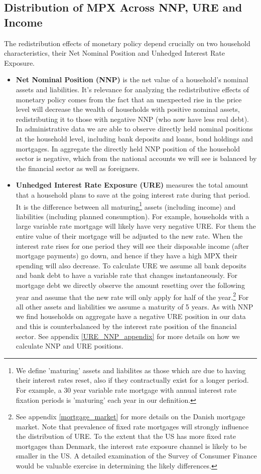 \documentclass[titlepage]{\econtex}\newcommand{\texname}{ConsumptionHeterogeneity}
\begin{document}
\subsection{Distribution of MPX Across NNP, URE and Income}
The redistribution effects of monetary policy depend crucially on two household characteristics, their Net Nominal Position and Unhedged Interest Rate Exposure.
\begin{itemize}
	\item \textbf{Net Nominal Position (NNP)} is the net value of a household's nominal assets and liabilities. It's relevance for analyzing the redistributive effects of monetary policy comes from the fact that an unexpected rise in the price level will decrease the wealth of households with positive nominal assets, redistributing it to those with negative NNP (who now have less real debt). In administrative data we are able to observe directly held nominal positions at the household level, including bank deposits and loans, bond holdings and mortgages. In aggregate the directly held NNP position of the household sector is negative, which from the national accounts we will see is balanced by the financial sector as well as foreigners.
	\item \textbf{Unhedged Interest Rate Exposure (URE)} measures the total amount that a household plans to save at the going interest rate during that period. It is the difference between all maturing\footnote{We define 'maturing' assets and liabilites as those which are due to having their interest rates reset, also if they contractually exist for a longer period. For example, a 30 year variable rate mortgage with annual interest rate fixation periods is 'maturing' each year in our definition.} assets (including income) and liabilities (including planned consumption). For example, households with a large variable rate mortgage will likely have very negative URE. For them the entire value of their mortgage will be adjusted to the new rate. When the interest rate rises for one period they will see their disposable income (after mortgage payments) go down, and hence if they have a high MPX their spending will also decrease. To calculate URE we assume all bank deposits and bank debt to have a variable rate that changes instantaneously. For mortgage debt we directly observe the amount resetting over the following year and assume that the new rate will only apply for half of the year.\footnote{See appendix \ref{mortgage_market} for more details on the Danish mortgage market. Note that prevalence of fixed rate mortgages will strongly influence the distribution of URE. To the extent that the US has more fixed rate mortgages than Denmark, the interest rate exposure channel is likely to be smaller in the US. A detailed examination of the Survey of Consumer Finance would be valuable exercise in determining the likely differences.} For all other assets and liabilities we assume a maturity of 5 years. As with NNP we find households on aggregate have a negative URE position in our data and this is counterbalanced by the interest rate position of the financial sector. See appendix \ref{URE_NNP_appendix} for more details on how we calculate NNP and URE positions.
\end{itemize}
\end{document}
